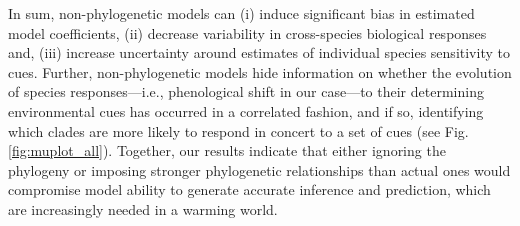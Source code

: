 \documentclass{article}\usepackage[]{graphicx}\usepackage[]{color}
\begin{document}
In sum, non-phylogenetic models can (i) induce significant bias in estimated model coefficients, (ii) decrease variability in cross-species biological responses and, (iii) increase  uncertainty around estimates of individual species sensitivity to cues. Further, non-phylogenetic models hide information on whether the evolution of species responses---i.e., phenological shift in our case---to their determining environmental cues has occurred in a correlated fashion, and if so, identifying which clades are more likely to respond in concert to a set of cues (see Fig. \ref{fig:muplot_all}). Together, our results indicate that either ignoring the phylogeny or imposing stronger phylogenetic relationships than actual ones would compromise model ability to generate accurate inference and prediction, which are increasingly needed in a warming world.\\ 







\end{document}
